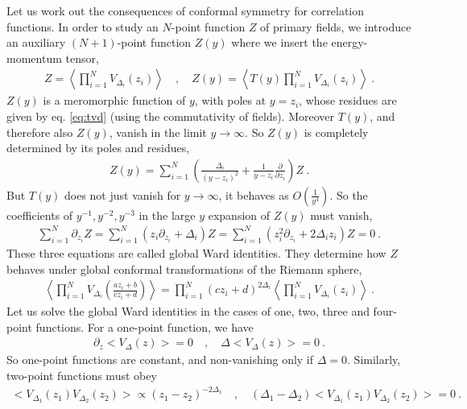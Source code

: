 \documentclass[12pt, a4paper]{article}
\theoremstyle{break}
\begin{document}
Let us work out the consequences of conformal symmetry for correlation functions.
In order to study an $N$-point function $Z$ of primary fields, we introduce an auxiliary $(N+1)$-point function $Z(y)$ where we insert the energy-momentum tensor,
\begin{align}
 Z = \left< \prod_{i=1}^N V_{\Delta_i}(z_i) \right> \quad , \quad Z(y) = \left< T(y) \prod_{i=1}^N V_{\Delta_i}(z_i) \right> \ .
\end{align}
$Z(y)$ is a meromorphic function of $y$, with poles at $y=z_i$, whose residues are given by eq. \eqref{eq:tvd} (using the commutativity of fields).
Moreover $T(y)$, and therefore also $Z(y)$, vanish in the limit $y\to \infty$. So $Z(y)$ is completely determined by its poles and residues,
\begin{align}
 Z(y) = \sum_{i=1}^N \left(\frac{\Delta_i}{(y-z_i)^2} +\frac{1}{y-z_i}\frac{\partial}{\partial z_i}\right) Z\ .
 \label{eq:zy}
\end{align}
But $T(y)$ does not just vanish for $y\to \infty$, it behaves as $O(\frac{1}{y^4})$.
So the coefficients of $y^{-1}, y^{-2}, y^{-3}$ in the large $y$ expansion of $Z(y)$ must vanish, 
\begin{align}
 \sum_{i=1}^N \partial_{z_i} Z = \sum_{i=1}^N \left(z_i \partial_{z_i} + \Delta_i\right) Z = \sum_{i=1}^N \left(z_i^2 \partial_{z_i} + 2\Delta_iz_i\right) Z = 0\ .
 \label{eq:gward}
\end{align}
These three equations are called global Ward identities. They determine how $Z$ behaves under global conformal transformations of the Riemann sphere,
\begin{align}
 \left< \prod_{i=1}^N  V_{\Delta_i}\left(\frac{az_i+b}{cz_i+d}\right) \right>
 = \prod_{i=1}^N (cz_i +d)^{2\Delta_i} \left< \prod_{i=1}^N V_{\Delta_i}(z_i) \right>\ .
 \label{eq:zgc}
\end{align}
Let us solve the global Ward identities in the cases of one, two, three and four-point functions. For a one-point function, we have 
\begin{align}
\partial_z \Big< V_\Delta(z)\Big> = 0 \quad , \quad \Delta \Big< V_\Delta(z)\Big> = 0\ .
\end{align}
So one-point functions are constant, and non-vanishing only if $\Delta=0$. Similarly, two-point functions must obey
\begin{align}
 \Big< V_{\Delta_1}(z_1)V_{\Delta_2}(z_2) \Big> \propto (z_1-z_2)^{-2\Delta_1} \quad , \quad (\Delta_1-\Delta_2)\Big< V_{\Delta_1}(z_1)V_{\Delta_2}(z_2) \Big>  = 0\ .
 \label{eq:2pt}
\end{align}
\end{document}
